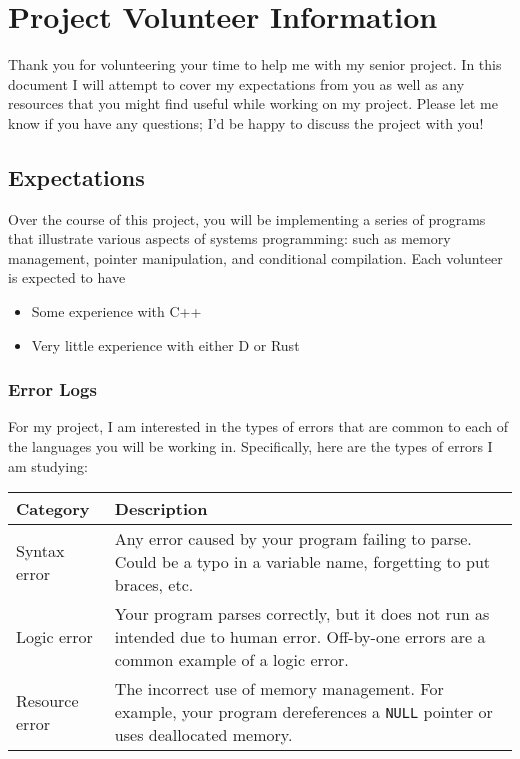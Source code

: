 \section{Project Volunteer
Information}\label{project-volunteer-information}

Thank you for volunteering your time to help me with my senior project.
In this document I will attempt to cover my expectations from you as
well as any resources that you might find useful while working on my
project. Please let me know if you have any questions; I'd be happy to
discuss the project with you!

\subsection{Expectations}\label{expectations}

Over the course of this project, you will be implementing a series of
programs that illustrate various aspects of systems programming: such as
memory management, pointer manipulation, and conditional compilation.
Each volunteer is expected to have

\begin{itemize}
\itemsep1pt\parskip0pt
\item
  Some experience with C++
\item
  Very little experience with either D or Rust
\end{itemize}

\subsubsection{Error Logs}\label{error-logs}

For my project, I am interested in the types of errors that are common
to each of the languages you will be working in. Specifically, here are
the types of errors I am studying:

\begin{center}
\begin{tabular}[c]{@{}lp{9cm}@{}}
\toprule
Category & Description \\
\midrule
Syntax error & Any error caused by your program failing to parse. Could
be a typo in a variable name, forgetting to put braces,
etc.\tabularnewline
Logic error & Your program parses correctly, but it does not run as
intended due to human error. Off-by-one errors are a common example of a
logic error.\tabularnewline
Resource error & The incorrect use of memory management. For example,
your program dereferences a \lstinline!NULL! pointer or uses deallocated
memory.\tabularnewline
\bottomrule
\end{tabular}
\end{center}

